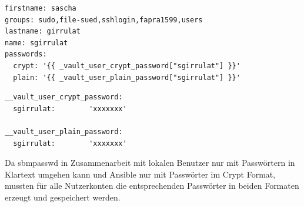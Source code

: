 \begin{lstlisting}[label=code:labelname,caption=Auszug aus ansible/group\_vars/file\_server/public]
firstname: sascha
groups: sudo,file-sued,sshlogin,fapra1599,users
lastname: girrulat
name: sgirrulat
passwords:
  crypt: '{{ _vault_user_crypt_password["sgirrulat"] }}'
  plain: '{{ _vault_user_plain_password["sgirrulat"] }}'
\end{lstlisting}

\begin{lstlisting}[label=code:labelname,caption=Modifizierter Auszug aus ansible/group\_vars/file\_server/vault]
__vault_user_crypt_password:
  sgirrulat:        'xxxxxxx'
  
__vault_user_plain_password:
  sgirrulat:        'xxxxxxx'
\end{lstlisting}

Da sbmpasswd in Zusammenarbeit mit lokalen Benutzer nur mit Passwörtern in Klartext umgehen kann und Ansible nur mit Passwörter im Crypt Format, mussten für alle Nutzerkonten die entsprechenden Passwörter in beiden Formaten erzeugt und gespeichert werden.

